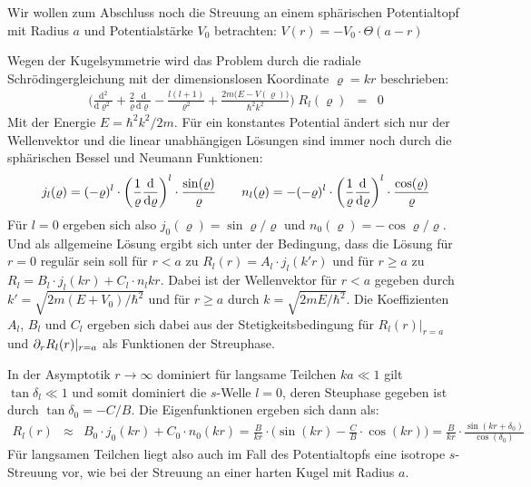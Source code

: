 Wir wollen zum Abschluss noch die Streuung an einem sphärischen Potentialtopf mit Radius $a$ und Potentialstärke $V_0$ betrachten: $V(r)=-V_0\cdot\Theta(a-r)$

Wegen der Kugelsymmetrie wird das Problem durch die radiale Schrödingergleichung mit der dimensionslosen Koordinate $\varrho=kr$ beschrieben:
\begin{eqnarray*}
	\bigg( \frac{\mathrm{d}^2}{\mathrm{d}\varrho^2} + \frac{2}{\varrho}\frac{\mathrm{d}}{\mathrm{d}\varrho} - \frac{l(l+1)}{\varrho^2} + \frac{2m\big(E-V(\varrho)\big)}{\hbar^2k^2} \bigg)\;R_l(\varrho) &=& 0
\end{eqnarray*}
Mit der Energie $E=\hbar^2k^2/2m$. Für ein konstantes Potential ändert sich nur der Wellenvektor und die linear unabhängigen Lösungen sind immer noch durch die sphärischen Bessel und Neumann Funktionen: 
\begin{eqnarray*}
	j_l(\varrho) = (-\varrho)^l \cdot\left(\frac{1}{\varrho}\frac{\mathrm{d}}{\mathrm{d}\varrho}\right)^l\cdot\frac{\sin(\varrho)}{\varrho} &\quad& n_l(\varrho) = -(-\varrho)^l \cdot\left(\frac{1}{\varrho}\frac{\mathrm{d}}{\mathrm{d}\varrho}\right)^l\cdot\frac{\cos(\varrho)}{\varrho}
\end{eqnarray*}
Für $l=0$ ergeben sich also $j_0(\varrho)=\sin\varrho/\varrho$ und $n_0(\varrho)=-\cos\varrho/\varrho$. Und als allgemeine Lösung ergibt sich unter der Bedingung, dass die Lösung für $r=0$ regulär sein soll für $r<a$ zu $R_l(r)=A_l\cdot j_l(k'r)$ und für $r\geq a$ zu $R_l=B_l\cdot j_l(kr)+C_l\cdot n_l{kr}$. Dabei ist der Wellenvektor für $r<a$ gegeben durch $k'=\sqrt{2m(E+V_0)/\hbar^2}$ und für $r\geq a$ durch $k=\sqrt{2mE/\hbar^2}$. Die Koeffizienten $A_l$, $B_l$ und $C_l$ ergeben sich dabei aus der Stetigkeitsbedingung für $R_l(r)|_{r=a}$ und $\partial_r R_l(r)|_{r=a}$ als Funktionen der Streuphase. 

In der Asymptotik $r\to\infty$ dominiert für langsame Teilchen $ka\ll1$ gilt $\tan\delta_l\ll1$ und somit dominiert die $s$-Welle $l=0$, deren Steuphase gegeben ist durch $\tan\delta_0=-C/B$. Die Eigenfunktionen ergeben sich dann als: 
\begin{eqnarray*}
	R_l(r) &\approx& B_0\cdot j_0(kr) + C_0 \cdot n_0(kr) = \frac B{kr}\cdot\Big(\sin(kr)-\frac{C}{B}\cdot\cos(kr) \Big) = \frac{B}{kr}\cdot\frac{\sin(kr + \delta_0)}{\cos(\delta_0)} 
\end{eqnarray*}
Für langsamen Teilchen liegt also auch im Fall des Potentialtopfs eine isotrope $s$-Streuung vor, wie bei der Streuung an einer harten Kugel mit Radius $a$. 

